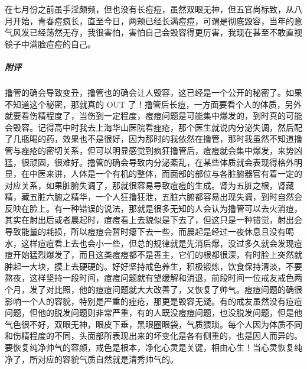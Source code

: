 \begin{case}
    在七月份之前虽手淫颇频，但也没有长痘痘，虽然双眼无神，但五官尚标致，从八月开始，青春痘疯长，直至今日，两颊已经长满痘痘，可谓是彻底毁容，当年的意气风发已经荡然无存，我很害怕，害怕自己会毁容得更厉害，我现在甚至不敢直视镜子中满脸痘痘的自己。
    \subparagraph{附评} 撸管的确会导致变丑，撸管也的确会让人毁容，这已经是一个公开的秘密了。如果不知道这个秘密，那就真的 OUT 了！撸管后长痘，一方面要看个人的体质，另外就要看伤精程度了，当伤到一定程度，痘痘问题是可能集中爆发的，到时真的可能会毁容。记得高中时我去上海华山医院看痤疮，那个医生就说内分泌失调，然后配了几瓶喝的药，效果也不是很好，因为那时的我依然在撸管，那时我虽然不知道撸管与痤疮的密切关系，但可以明显感觉到疯狂撸管后，痘痘就会集中爆发，来势凶猛，很顽固，很难好。撸管的确会导致内分泌紊乱，在某些体质就会表现得格外明显，在中医来讲，人体是一个有机的整体，而面部的部位与各脏腑器官有着一定的对应关系，如果脏腑失调了，那就很容易导致痘痘的生成。肾为五脏之根，肾藏精，藏五脏六腑之精华，一个人狂撸狂泄，五脏六腑都容易出现失调，到时自然会反映在脸上。有一种错误的说法，那就是很多无知的人会认为撸管可以去火消痘，其实在射出后或者晨起时，痘痘看上去貌似是下去了，但这只是一种错觉，射出会导致能量的耗损，所以痘痘会暂时瘪下去一些，而晨起是经过一夜休息且没有喝水，这样痘痘看上去也会小一些，但总的规律就是先消后爆，没过多久就会发现痘痘开始猛烈爆发了，而且这类痘痘都不是善主，它们的根都很深，有时脸上突然就肿起一大块，摸上去硬硬的。好好坚持戒色养生，积极锻炼，饮食保持清淡，不要熬夜，这样坚持一段时间，痘痘问题就有望缓解和消退，前段时间一位戒友戒色两个月，发了对比照，他的痘痘问题就大大改善了，又恢复了帅气。痘痘问题的确很影响一个人的容貌，特别是严重的痤疮，那更是毁容无疑。有的戒友虽然没有痘痘问题，但他的脱发问题则非常严重，有的人既没痘痘问题，也没脱发问题，但是他气色很不好，双眼无神，眼皮下垂，黑眼圈眼袋，气质猥琐。每个人因为体质不同和伤精程度的不同，头面部所表现出来的坏变化是各有侧重的，也是因人而异的。要恢复纯净帅气的容颜，戒色是根本，净化心灵是关键，相由心生！当心灵恢复纯净了，所对应的容貌气质自然就是清秀帅气的。
\end{case}

